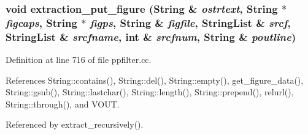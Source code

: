 \subsubsection{\setlength{\rightskip}{0pt plus 5cm}void extraction\_\-put\_\-figure ({\bf String} \& {\em ostrtext}, {\bf String} $\ast$ {\em figcaps}, {\bf String} $\ast$ {\em figps}, {\bf String} \& {\em figfile}, {\bf String\-List} \& {\em srcf}, {\bf String\-List} \& {\em srcfname}, int \& {\em srcfnum}, {\bf String} \& {\em poutline})}\label{ppfilter_8cc_a19}




Definition at line 716 of file ppfilter.cc.

References String::contains(), String::del(), String::empty(), get\_\-figure\_\-data(), String::gsub(), String::lastchar(), String::length(), String::prepend(), relurl(), String::through(), and VOUT.

Referenced by extract\_\-recursively().



